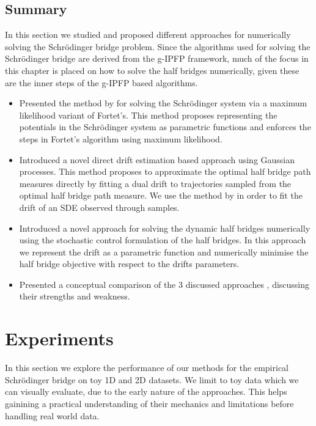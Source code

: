 \documentclass[a4paper,12pt,twoside,openright]{report}
\theoremstyle{definition}
\begin{document}
\section{Summary}

In this section we studied and proposed different approaches for numerically solving the Schrödinger bridge problem. Since the algorithms used for solving the Schrödinger bridge are derived from the g-IPFP framework, much of the focus in this chapter is placed on how to solve the half bridges numerically, given these are the inner steps of the g-IPFP based algorithms. 

\begin{itemize}
    \item Presented the method by \cite{pavon2018data} for solving the  Schrödinger system via a maximum likelihood variant of Fortet's. This method proposes representing the potentials in the Schrödinger system as parametric functions and enforces the steps in Fortet's algorithm using maximum likelihood.
    \item Introduced a novel direct drift estimation based approach using Gaussian processes. This method proposes to approximate the optimal half bridge path measures directly by fitting a dual drift to trajectories sampled from the optimal half bridge path measure. We use the method by \cite{ruttor2013approximate} in order to fit the drift of an SDE observed through samples.
    \item Introduced a novel approach for solving the dynamic half bridges numerically using the stochastic control formulation of the half bridges. In this approach we represent the drift as a parametric function and numerically minimise the half bridge objective with respect to the drifts parameters. 
    \item Presented a conceptual comparison of the 3 discussed approaches , discussing their strengths and weakness. 
\end{itemize}
\chapter{Experiments}

In this section we explore the performance of our methods for the empirical Schrödinger bridge on toy 1D and 2D datasets. We limit to toy data which we can visually evaluate, due to the early nature of the approaches. This helps gainining a practical understanding of their mechanics and limitations before handling real world data. 
\end{document}
